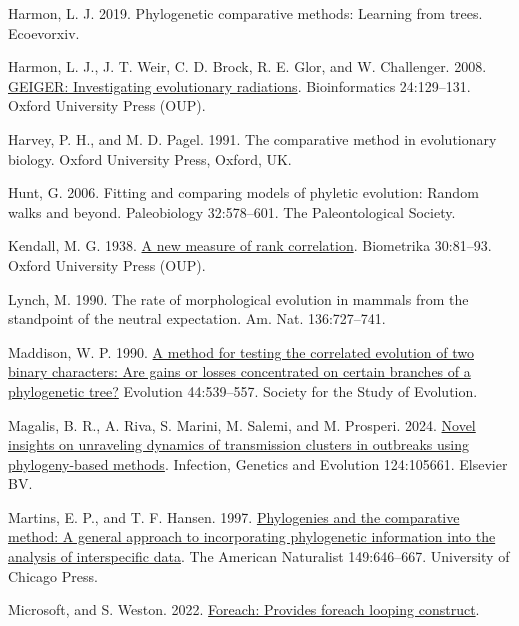 \documentclass[fleqn,10pt,lineno]{wlpeerj} %
\newlength{\cslhangindent}
\newenvironment{CSLReferences}[2] %
 {\begin{list}{}{%
  \setlength{\itemindent}{0pt}
  \setlength{\leftmargin}{0pt}
  \setlength{\parsep}{0pt}
  \ifodd #1
   \setlength{\leftmargin}{\cslhangindent}
   \setlength{\itemindent}{-1\cslhangindent}
  \fi
  \setlength{\itemsep}{#2\baselineskip}}}
 {\end{list}}
\begin{document}
\begin{CSLReferences}{1}{0}
Harmon, L. J. 2019. Phylogenetic comparative methods: Learning from trees. Ecoevorxiv.

Harmon, L. J., J. T. Weir, C. D. Brock, R. E. Glor, and W. Challenger. 2008. \href{https://doi.org/10.1093/bioinformatics/btm538}{GEIGER: Investigating evolutionary radiations}. Bioinformatics 24:129--131. Oxford University Press (OUP).

Harvey, P. H., and M. D. Pagel. 1991. The comparative method in evolutionary biology. Oxford University Press, Oxford, UK.

Hunt, G. 2006. Fitting and comparing models of phyletic evolution: Random walks and beyond. Paleobiology 32:578--601. The Paleontological Society.

Kendall, M. G. 1938. \href{https://doi.org/10.1093/biomet/30.1-2.81}{A new measure of rank correlation}. Biometrika 30:81--93. Oxford University Press (OUP).

Lynch, M. 1990. The rate of morphological evolution in mammals from the standpoint of the neutral expectation. Am. Nat. 136:727--741.

Maddison, W. P. 1990. \href{https://doi.org/10.2307/2409435}{A method for testing the correlated evolution of two binary characters: Are gains or losses concentrated on certain branches of a phylogenetic tree?} Evolution 44:539--557. Society for the Study of Evolution.

Magalis, B. R., A. Riva, S. Marini, M. Salemi, and M. Prosperi. 2024. \href{https://doi.org/10.1016/j.meegid.2024.105661}{Novel insights on unraveling dynamics of transmission clusters in outbreaks using phylogeny-based methods}. Infection, Genetics and Evolution 124:105661. Elsevier BV.

Martins, E. P., and T. F. Hansen. 1997. \href{https://doi.org/10.1086/286013}{Phylogenies and the comparative method: A general approach to incorporating phylogenetic information into the analysis of interspecific data}. The American Naturalist 149:646--667. University of Chicago Press.

Microsoft, and S. Weston. 2022. \href{https://CRAN.R-project.org/package=foreach}{Foreach: Provides foreach looping construct}.


\end{CSLReferences}
\end{document}
